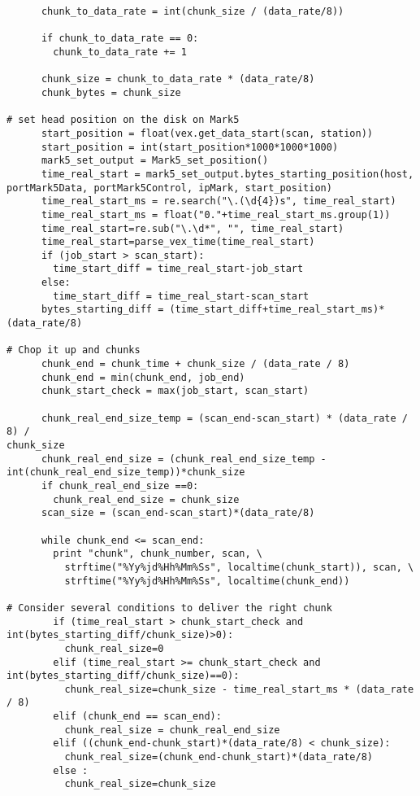 \begin{verbatim}
      chunk_to_data_rate = int(chunk_size / (data_rate/8))

      if chunk_to_data_rate == 0:
        chunk_to_data_rate += 1

      chunk_size = chunk_to_data_rate * (data_rate/8)
      chunk_bytes = chunk_size

# set head position on the disk on Mark5
      start_position = float(vex.get_data_start(scan, station))
      start_position = int(start_position*1000*1000*1000)
      mark5_set_output = Mark5_set_position()
      time_real_start = mark5_set_output.bytes_starting_position(host,
portMark5Data, portMark5Control, ipMark, start_position)
      time_real_start_ms = re.search("\.(\d{4})s", time_real_start)
      time_real_start_ms = float("0."+time_real_start_ms.group(1))
      time_real_start=re.sub("\.\d*", "", time_real_start)
      time_real_start=parse_vex_time(time_real_start)
      if (job_start > scan_start):
        time_start_diff = time_real_start-job_start
      else:
        time_start_diff = time_real_start-scan_start
      bytes_starting_diff = (time_start_diff+time_real_start_ms)*(data_rate/8)

# Chop it up and chunks 
      chunk_end = chunk_time + chunk_size / (data_rate / 8)
      chunk_end = min(chunk_end, job_end)
      chunk_start_check = max(job_start, scan_start)
      
      chunk_real_end_size_temp = (scan_end-scan_start) * (data_rate / 8) /
chunk_size
      chunk_real_end_size = (chunk_real_end_size_temp -
int(chunk_real_end_size_temp))*chunk_size
      if chunk_real_end_size ==0:
        chunk_real_end_size = chunk_size
      scan_size = (scan_end-scan_start)*(data_rate/8)
      
      while chunk_end <= scan_end:
        print "chunk", chunk_number, scan, \
          strftime("%Yy%jd%Hh%Mm%Ss", localtime(chunk_start)), scan, \
          strftime("%Yy%jd%Hh%Mm%Ss", localtime(chunk_end))

# Consider several conditions to deliver the right chunk
        if (time_real_start > chunk_start_check and
int(bytes_starting_diff/chunk_size)>0):
          chunk_real_size=0
        elif (time_real_start >= chunk_start_check and
int(bytes_starting_diff/chunk_size)==0):
          chunk_real_size=chunk_size - time_real_start_ms * (data_rate / 8)
        elif (chunk_end == scan_end):
          chunk_real_size = chunk_real_end_size
        elif ((chunk_end-chunk_start)*(data_rate/8) < chunk_size):
          chunk_real_size=(chunk_end-chunk_start)*(data_rate/8)
        else :
          chunk_real_size=chunk_size


\end{verbatim}
